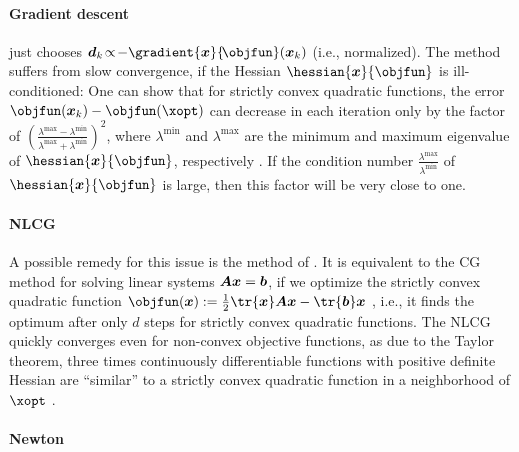 \paragraph{Gradient descent}

just chooses $\*d_k
\!\propto\! -\gradient{\*x}{\!\objfun}(\*x_k)$ (i.e., normalized).
The method suffers from slow convergence,
if the Hessian $\hessian{\*x}{\objfun}$ is ill-conditioned:
One can show that for strictly convex quadratic functions,
the error $\objfun(\*x_k) - \objfun(\xopt)$
can decrease in each iteration only by the factor of
$(\tfrac{\lambda^{\max} - \lambda^{\min}}{\lambda^{\max} + \lambda^{\min}})^2$,
where $\lambda^{\min}$ and $\lambda^{\max}$ are the minimum and maximum
eigenvalue of $\hessian{\*x}{\objfun}$, respectively
\cite{Ulbrich12Nichtlineare}.
If the condition number
$\tfrac{\lambda^{\max}}{\lambda^{\min}}$
of $\hessian{\*x}{\objfun}$ is large,
then this factor will be very close to one.

\paragraph{NLCG}

A possible remedy for this issue is the method of
.
It is equivalent to the CG method for solving \spd linear systems
${\boldsymbol{A}} {\boldsymbol{x}} = {\boldsymbol{b}}$,
if we optimize the strictly convex quadratic function
$\objfun(\*x) := \frac{1}{2} \tr{\*x} \mat{A} \*x - \tr{\*b} \*x$
, i.e.,
it finds the optimum after only $d$ steps for strictly convex
quadratic functions.
The NLCG quickly converges even for non-convex objective functions,
as due to the Taylor theorem,
three times continuously differentiable functions
with positive definite Hessian are ``similar'' to a
strictly convex quadratic function in a neighborhood of $\xopt$
\cite{Valentin14Hierarchische}.

\paragraph{Newton}

